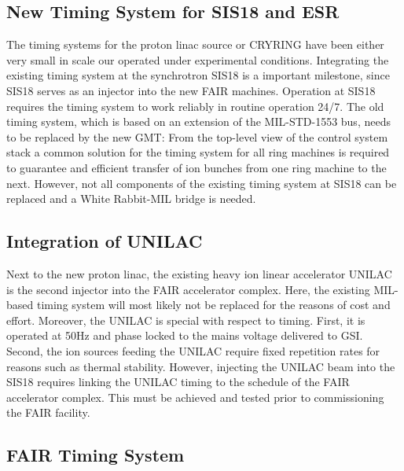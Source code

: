 \subsection{New Timing System for SIS18 and ESR}

 The timing systems for the proton linac source or  CRYRING have been 
 either very small in scale  our operated  under experimental  conditions.   
 Integrating the existing  timing  system  at  the  synchrotron SIS18  is  
 a  important milestone, since SIS18 serves as  an injector into the new FAIR machines.
 Operation  at SIS18  requires the  timing system  to work  reliably in
 routine operation 24/7.   The old timing system, which  is based on an
 extension of  the MIL-STD-1553  bus, needs to  be replaced by  the new
 GMT:  From the top-level  view of  the control  system stack  a common
 solution for  the timing system for  all ring machines  is required to
 guarantee and efficient transfer of ion bunches from one ring machine
 to the next. However, not all components of the existing timing system
 at SIS18 can be replaced and a White Rabbit-MIL bridge is needed.

\subsection{Integration of UNILAC}

Next to   the   new proton   linac,  the existing     heavy ion linear
accelerator UNILAC  is the second injector  into the  FAIR accelerator
complex.  Here, the existing MIL-based timing  system will most likely
not be  replaced for the reasons   of cost and effort.   Moreover, the
UNILAC is special  with respect  to  timing. First, it  is operated at
50Hz and phase locked to the mains voltage  delivered to GSI.  Second,
the ion sources feeding the UNILAC require  fixed repetition rates for
reasons such as thermal stability.  However, injecting the UNILAC beam
into the SIS18 requires linking  the UNILAC timing  to the schedule of
the FAIR accelerator complex.  This must  be achieved and tested prior
to commissioning the FAIR facility.


\subsection{FAIR Timing System}

